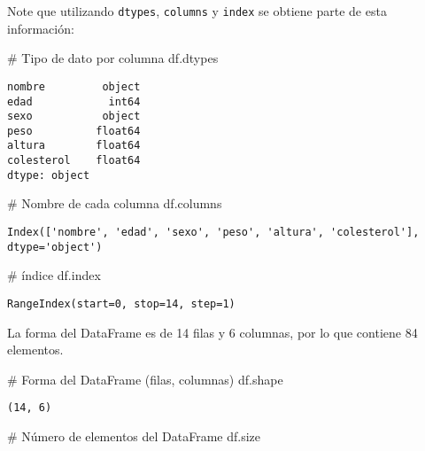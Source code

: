 \documentclass[
  letterpaper,
  DIV=11,
  numbers=noendperiod]{scrreprt}
\newenvironment{Shaded}{\begin{snugshade}}{\end{snugshade}}
\newcommand{\CommentTok}[1]{\textcolor[rgb]{0.37,0.37,0.37}{#1}}
\newcommand{\NormalTok}[1]{\textcolor[rgb]{0.00,0.23,0.31}{#1}}
\begin{document}
Note que utilizando \texttt{dtypes}, \texttt{columns} y \texttt{index}
se obtiene parte de esta información:

\begin{Shaded}
\begin{Highlighting}[]
\CommentTok{\# Tipo de dato por columna}
\NormalTok{df.dtypes}
\end{Highlighting}
\end{Shaded}

\begin{verbatim}
nombre         object
edad            int64
sexo           object
peso          float64
altura        float64
colesterol    float64
dtype: object
\end{verbatim}

\begin{Shaded}
\begin{Highlighting}[]
\CommentTok{\# Nombre de cada columna}
\NormalTok{df.columns}
\end{Highlighting}
\end{Shaded}

\begin{verbatim}
Index(['nombre', 'edad', 'sexo', 'peso', 'altura', 'colesterol'], dtype='object')
\end{verbatim}

\begin{Shaded}
\begin{Highlighting}[]
\CommentTok{\# índice}
\NormalTok{df.index}
\end{Highlighting}
\end{Shaded}

\begin{verbatim}
RangeIndex(start=0, stop=14, step=1)
\end{verbatim}

La forma del DataFrame es de 14 filas y 6 columnas, por lo que contiene
84 elementos.

\begin{Shaded}
\begin{Highlighting}[]
\CommentTok{\# Forma del DataFrame (filas, columnas)}
\NormalTok{df.shape}
\end{Highlighting}
\end{Shaded}

\begin{verbatim}
(14, 6)
\end{verbatim}

\begin{Shaded}
\begin{Highlighting}[]
\CommentTok{\# Número de elementos del DataFrame}
\NormalTok{df.size}
\end{Highlighting}
\end{Shaded}
\end{document}
